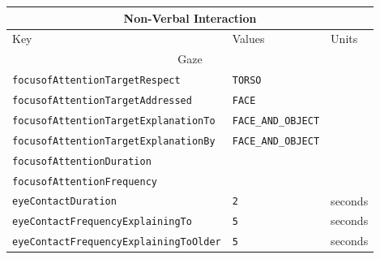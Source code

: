 \documentclass{CSSRforAfrica}
\begin{document}
 
\begin{table}[H]
\begin{center}
\begin{tabular}{|l l l|}
\hline \hline
\multicolumn{3}{|c|}{{\small \bf Non-Verbal Interaction}} \\
\hline \hline
 {\small  Key  }                                         &  {\small Values }    &  {\small Units }      \\
\hline
\multicolumn{3}{|c|}{{\footnotesize Gaze}}  \vspace{-0.75mm}\\
\hline
{\footnotesize \verb+focusofAttentionTargetRespect+}          & {\footnotesize \verb+TORSO+ } \vspace{-1.01mm} & {\footnotesize  } \\
{\footnotesize \verb+focusofAttentionTargetAddressed+}      & {\footnotesize \verb+FACE+}  \vspace{-1.01mm} & {\footnotesize  } \\
{\footnotesize \verb+focusofAttentionTargetExplanationTo+} & {\footnotesize \verb+FACE_AND_OBJECT+ }\vspace{-1.01mm}  & {\footnotesize  } \\
{\footnotesize \verb+focusofAttentionTargetExplanationBy+} 	    & {\footnotesize \verb+FACE_AND_OBJECT+}\vspace{-1.01mm} & {\footnotesize  }  \\
{\footnotesize \verb+focusofAttentionDuration+}     & {\footnotesize \verb++ } \vspace{-1.01mm} & {\footnotesize  } \\
{\footnotesize \verb+focusofAttentionFrequency+}   & {\footnotesize \verb++} \vspace{-1.01mm} & {\footnotesize  } \\
{\footnotesize \verb+eyeContactDuration+}                             & {\footnotesize \verb+2+}  \vspace{-1.01mm} & {\footnotesize  seconds} \\
{\footnotesize \verb+eyeContactFrequencyExplainingTo+} 	    & {\footnotesize \verb+5+} \vspace{-1.01mm} & {\footnotesize seconds } \\
{\footnotesize \verb+eyeContactFrequencyExplainingToOlder+} 	    & {\footnotesize \verb+5+} \vspace{-1.01mm} & {\footnotesize seconds } \\

\end{tabular}
\end{center}
\end{table}
\end{document}

